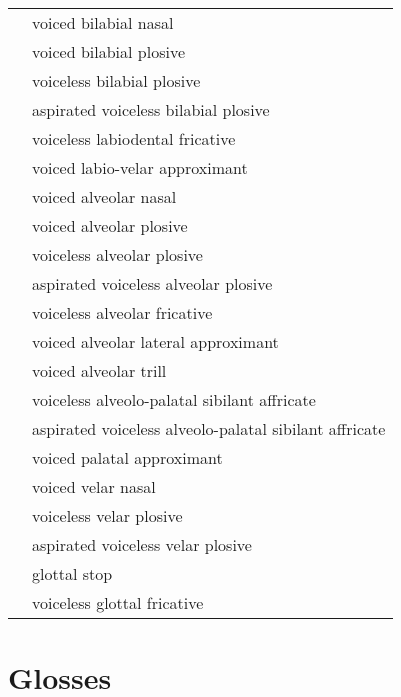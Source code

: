 \documentclass{article}
\begin{document}
\begin{xltabular}{\textwidth}{lL}
   & voiced bilabial nasal \\
   & voiced bilabial plosive \\
   & voiceless bilabial plosive \\
   & aspirated voiceless bilabial plosive \\
   & voiceless labiodental fricative \\
   & voiced labio-velar approximant \\
   & voiced alveolar nasal \\
   & voiced alveolar plosive \\
   & voiceless alveolar plosive \\
   & aspirated voiceless alveolar plosive \\
   & voiceless alveolar fricative \\
   & voiced alveolar lateral approximant \\
   & voiced alveolar trill \\
  \ipa{\texttctclig} & voiceless alveolo-palatal sibilant affricate \\
   & aspirated voiceless alveolo-palatal sibilant affricate\\
   & voiced palatal approximant \\
   & voiced velar nasal \\
   & voiceless velar plosive \\
   & aspirated voiceless velar plosive \\
   & glottal stop \\
   & voiceless glottal fricative \\
\end{xltabular}

\newpage\section{Glosses}
\end{document}
